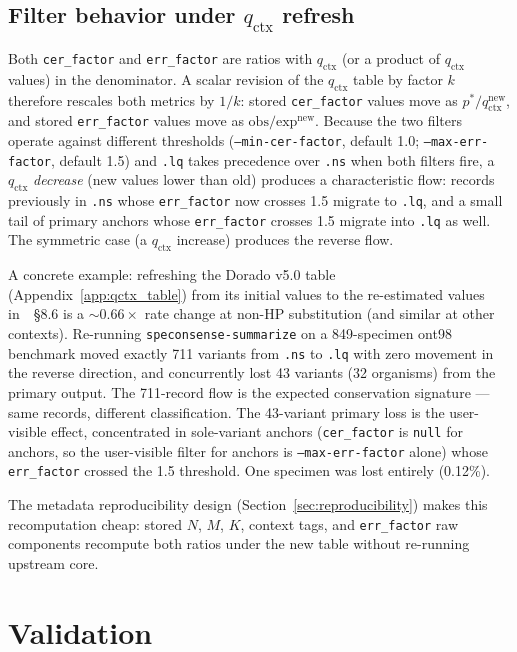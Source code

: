 \documentclass[11pt]{article}
\begin{document}
\subsection{Filter behavior under $q_\text{ctx}$ refresh}
\label{sec:qctx_refresh}

Both \texttt{cer\_factor} and \texttt{err\_factor} are ratios with
$q_\text{ctx}$ (or a product of $q_\text{ctx}$ values) in the denominator. A
scalar revision of the $q_\text{ctx}$ table by factor $k$ therefore rescales
both metrics by $1/k$: stored \texttt{cer\_factor} values move as
$p^*/q_\text{ctx}^\text{new}$, and stored \texttt{err\_factor} values move as
$\mathrm{obs}/\mathrm{exp}^\text{new}$. Because the two filters operate against
different thresholds (\texttt{--min-cer-factor}, default 1.0;
\texttt{--max-err-factor}, default 1.5) and \texttt{.lq} takes precedence over
\texttt{.ns} when both filters fire, a $q_\text{ctx}$ \emph{decrease} (new
values lower than old) produces a characteristic flow: records previously in
\texttt{.ns} whose \texttt{err\_factor} now crosses 1.5 migrate to
\texttt{.lq}, and a small tail of primary anchors whose \texttt{err\_factor}
crosses 1.5 migrate into \texttt{.lq} as well. The symmetric case (a
$q_\text{ctx}$ increase) produces the reverse flow.

A concrete example: refreshing the Dorado v5.0 table (Appendix~\ref{app:qctx_table})
from its initial values to the re-estimated values in~\cite{hp_paper}~\S 8.6 is
a $\sim\!0.66\times$ rate change at non-HP substitution (and similar at other
contexts). Re-running \texttt{speconsense-summarize} on a 849-specimen ont98
benchmark moved exactly 711 variants from \texttt{.ns} to \texttt{.lq} with
zero movement in the reverse direction, and concurrently lost 43 variants
(32 organisms) from the primary output. The 711-record flow is the expected
conservation signature --- same records, different classification. The
43-variant primary loss is the user-visible effect, concentrated in
sole-variant anchors (\texttt{cer\_factor} is \texttt{null} for anchors, so
the user-visible filter for anchors is \texttt{--max-err-factor} alone)
whose \texttt{err\_factor} crossed the 1.5 threshold. One specimen was lost
entirely (0.12\%).

The metadata reproducibility design (Section~\ref{sec:reproducibility}) makes
this recomputation cheap: stored $N$, $M$, $K$, context tags, and
\texttt{err\_factor} raw components recompute both ratios under the new
table without re-running upstream core.

\section{Validation}
\label{sec:validation}
\end{document}
